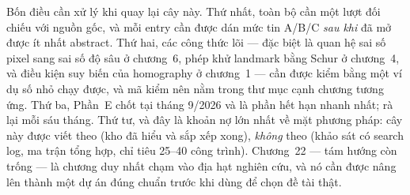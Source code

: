 \documentclass[vslam.tex]{subfiles}
\begin{document}
Bốn điều cần xử lý khi quay lại cây này. Thứ nhất, toàn bộ  cần một lượt đối chiếu với nguồn gốc, và mỗi entry cần được dán mức tin A/B/C \emph{sau khi} đã mở được ít nhất abstract. Thứ hai, các công thức lõi --- đặc biệt là quan hệ sai số pixel sang sai số độ sâu ở chương~6, phép khử landmark bằng Schur ở chương~4, và điều kiện suy biến của homography ở chương~1 --- cần được kiểm bằng một ví dụ số nhỏ chạy được, và mã kiểm nên nằm trong thư mục  cạnh chương tương ứng. Thứ ba, Phần~E chốt tại tháng 9/2026 và là phần hết hạn nhanh nhất; rà lại mỗi sáu tháng. Thứ tư, và đây là khoản nợ lớn nhất về mặt phương pháp: cây này được viết theo  (kho đã hiểu và sắp xếp xong), \emph{không} theo  (khảo sát có search log, ma trận tổng hợp, chỉ tiêu 25--40 công trình). Chương~22 --- tám hướng còn trống --- là chương duy nhất chạm vào địa hạt nghiên cứu, và nó cần được nâng lên thành một dự án  đúng chuẩn trước khi dùng để chọn đề tài thật.
\end{document}
